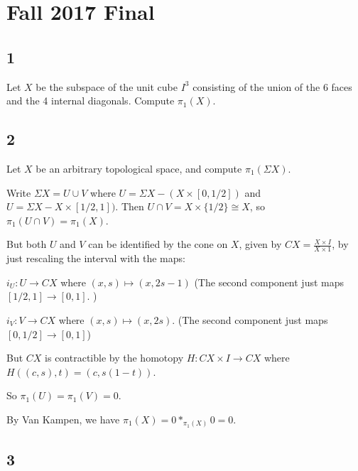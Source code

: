 \hypertarget{fall-2017-final}{%
\section{Fall 2017 Final}\label{fall-2017-final}}

\hypertarget{section-14}{%
\subsection{1}\label{section-14}}

Let \(X\) be the subspace of the unit cube \(I^3\) consisting of the
union of the 6 faces and the 4 internal diagonals. Compute \(\pi_1(X)\).

\hypertarget{section-15}{%
\subsection{2}\label{section-15}}

Let \(X\) be an arbitrary topological space, and compute
\(\pi_1(\Sigma X)\).

\begin{solution}

Write \(\Sigma X = U \cup V\) where \(U = \Sigma X - (X\times[0,1/2])\)
and \(U = \Sigma X - X\times[1/2, 1])\). Then
\(U\cap V = X \times\{1/2\} \cong X\), so \(\pi_1(U\cap V) =\pi_1(X)\).

But both \(U\) and \(V\) can be identified by the cone on \(X\), given
by \(CX = \frac{X \times I}{X \times 1}\), by just rescaling the
interval with the maps:

\(i_U: U \to CX\) where \((x,s) \mapsto (x, 2s-1)\) (The second
component just maps \([1/2, 1] \to[0,1]\). )

\(i_V: V \to CX\) where \((x, s) \mapsto (x, 2s)\). (The second
component just maps \([0,1/2] \to [0, 1]\))

But \(CX\) is contractible by the homotopy \(H:CX \times I \to CX\)
where \(H((c,s), t) = (c, s(1-t))\).

So \(\pi_1(U) = \pi_1(V) = 0\).

By Van Kampen, we have \(\pi_1(X) = 0 \ast_{\pi_1(X)} 0 = 0.\)

\end{solution}

\hypertarget{section-16}{%
\subsection{3}\label{section-16}}

